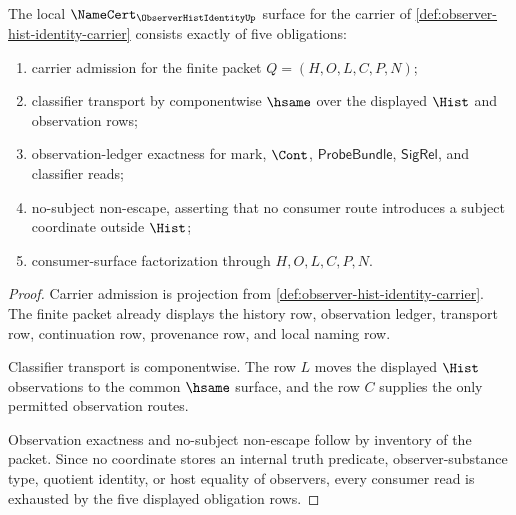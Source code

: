 \begin{theorem}\label{thm:observer-hist-identity-namecert-obligations}
The local $\NameCert_{\ObserverHistIdentityUp}$ surface for the carrier of \autoref{def:observer-hist-identity-carrier} consists exactly of five obligations:
\begin{enumerate}
\item carrier admission for the finite packet $Q=(H,O,L,C,P,N)$;
\item classifier transport by componentwise $\hsame$ over the displayed $\Hist$ and observation rows;
\item observation-ledger exactness for mark, $\Cont$, $\mathsf{ProbeBundle}$, $\mathsf{SigRel}$, and classifier reads;
\item no-subject non-escape, asserting that no consumer route introduces a subject coordinate outside $\Hist$;
\item consumer-surface factorization through $H,O,L,C,P,N$.
\end{enumerate}
\end{theorem}
\begin{proof}
Carrier admission is projection from \autoref{def:observer-hist-identity-carrier}. The finite packet already displays the history row, observation ledger, transport row, continuation row, provenance row, and local naming row.

Classifier transport is componentwise. The row $L$ moves the displayed $\Hist$ observations to the common $\hsame$ surface, and the row $C$ supplies the only permitted observation routes.

Observation exactness and no-subject non-escape follow by inventory of the packet. Since no coordinate stores an internal truth predicate, observer-substance type, quotient identity, or host equality of observers, every consumer read is exhausted by the five displayed obligation rows.
\end{proof}

